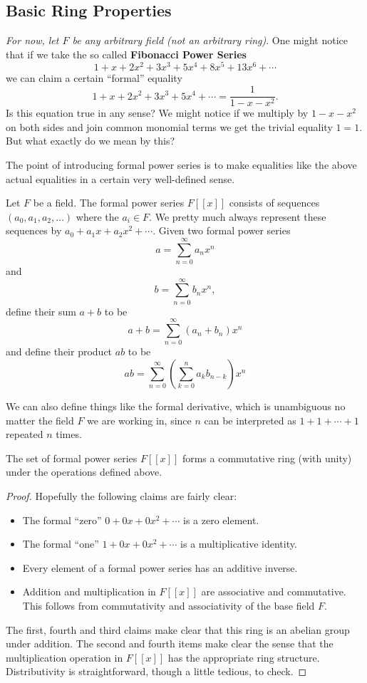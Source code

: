 \subsection{Basic Ring Properties}

\textit{For now, let $F$ be any arbitrary field (not an arbitrary ring)}. One might notice that if we take the so called \textbf{Fibonacci Power Series} 
\[1 + x + 2x^2 + 3x^3 + 5x^4 + 8x^5 + 13x^6 + \cdots\] we can claim a certain ``formal'' equality
\[1 + x + 2x^2 + 3x^3 + 5x^4 + \cdots = \frac{1}{1 - x - x^2}.\]
Is this equation true in any sense? We might notice if we multiply by $1 - x - x^2$ on both sides and join common monomial terms we get the trivial equality $1 = 1$. But what exactly do we mean by this?

The point of introducing formal power series is to make equalities like the above actual equalities in a certain very well-defined sense.

\begin{definition}
Let $F$ be a field. The formal power series $F[[x]]$ consists of sequences $(a_0, a_1, a_2, \dots)$ where the $a_i \in F$. We pretty much always represent these sequences by $a_0 + a_1x + a_2x^2 + \cdots$. Given two formal power series
\[a = \sum_{n = 0}^{\infty}a_nx^n\] and
\[b = \sum_{n = 0}^{\infty}b_nx^n,\] define their sum $a+b$ to be
\[a + b = \sum_{n=0}^{\infty}(a_n + b_n)x^n\] and
define their product $ab$ to be
\[ab = \sum_{n = 0}^{\infty}\left(\sum_{k = 0}^na_kb_{n-k}\right)x^n\]

We can also define things like the formal derivative, which is unambiguous no matter the field $F$ we are working in, since $n$ can be interpreted as $1 + 1 + \cdots + 1$ repeated $n$ times.
\end{definition}

\begin{proposition}
The set of formal power series $F[[x]]$ forms a commutative ring (with unity) under the operations defined above.
\end{proposition}
\begin{proof}
Hopefully the following claims are fairly clear:
\begin{itemize}
	\item The formal ``zero'' $0 + 0x + 0x^2 + \cdots$ is a zero element.
	\item The formal ``one'' $1 + 0x + 0x^2 + \cdots$ is a multiplicative identity.
	\item Every element of a formal power series has an additive inverse.
	\item Addition and multiplication in $F[[x]]$ are associative and commutative. This follows from commutativity and associativity of the base field $F$.
\end{itemize}

The first, fourth and third claims make clear that this ring is an abelian group under addition. The second and fourth items make clear the sense that the multiplication operation in $F[[x]]$ has the appropriate ring structure. Distributivity is straightforward, though a little tedious, to check.
\end{proof}

